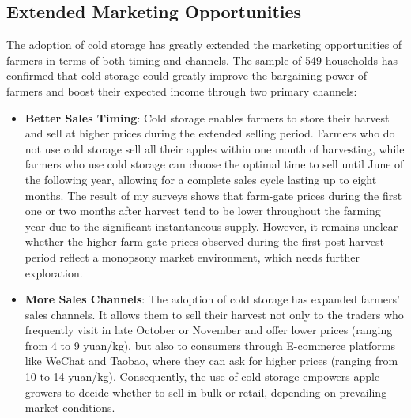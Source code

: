 \subsection{Extended Marketing Opportunities}
\noindent The adoption of cold storage has greatly extended the marketing opportunities of farmers in terms of both timing and channels. The sample of 549 households has confirmed that cold storage could greatly improve the bargaining power of farmers and boost their expected income through two primary channels:
\begin{itemize}
    \item \textbf{Better Sales Timing}: Cold storage enables farmers to store their harvest and sell at higher prices during the extended selling period. Farmers who do not use cold storage sell all their apples within one month of harvesting, while farmers who use cold storage can choose the optimal time to sell until June of the following year, allowing for a complete sales cycle lasting up to eight months. The result of my surveys shows that farm-gate prices during the first one or two months after harvest tend to be lower throughout the farming year due to the significant instantaneous supply. However, it remains unclear whether the higher farm-gate prices observed during the first post-harvest period reflect a monopsony market environment, which needs further exploration.
    
    \item \textbf{More Sales Channels}: The adoption of cold storage has expanded farmers' sales channels. It allows them to sell their harvest not only to the traders who frequently visit in late October or November and offer lower prices (ranging from 4 to 9 yuan/kg), but also to consumers through E-commerce platforms like WeChat and Taobao, where they can ask for higher prices (ranging from 10 to 14 yuan/kg). Consequently, the use of cold storage empowers apple growers to decide whether to sell in bulk or retail, depending on prevailing market conditions.
\end{itemize}



